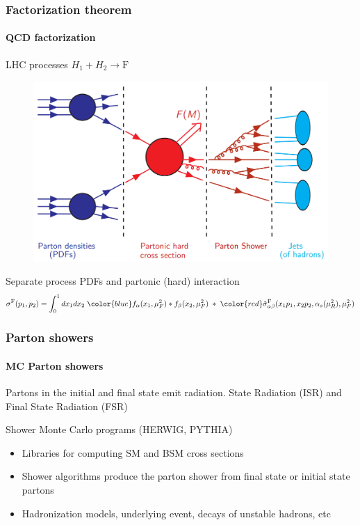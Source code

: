 \documentclass[aspectratio=43]{beamer}
\begin{document}
\begin{frame}

	\frametitle{Factorization theorem}
	\framesubtitle{QCD factorization}
	
	\center \footnotesize LHC processes $H_{1} + H_{2} \rightarrow \textrm{F}$
	
	\begin{figure}
		\includegraphics[width = 7 cm]{plots/factorization_1.png}
	\end{figure}
	
	\footnotesize {Separate process {\color{blue}PDFs} and {\color{red} partonic (hard) interaction}	
	\begin{equation}
		\sigma^{\textrm{F}}(p_{1}, p_{2}) =
		\int_{0}^{1} dx_{1} dx_{2} \; {\color{blue} f_{\alpha}(x_{1}, \mu_{F}^{2}) \ast f_{\beta}(x_{2}, \mu_{F}^{2})}
		\; \ast \;  
		{\color{red}\hat{\sigma}^{\textrm{F}}_{\alpha \beta}(x_{1}p_{1}, x_{2}p_{2}, \alpha_{s}(\mu_{R}^{2}), \mu_{F}^{2})} \nonumber
	\end{equation}}
		
\end{frame}

\begin{frame}

	\frametitle{Parton showers}
	\framesubtitle{MC Parton showers}
	
	\footnotesize Partons in the initial and final state emit radiation. State Radiation (ISR) and Final State Radiation (FSR)
	
	\vspace{0.1 cm}
	\center \color{red} Shower Monte Carlo programs (HERWIG, PYTHIA)
	\vspace{0.15 cm}
	
	\begin{itemize} 
		\item Libraries for computing SM and BSM cross sections
		\item Shower algorithms produce the parton shower from final state or initial state partons
		\item Hadronization models, underlying event, decays of unstable hadrons, etc
	\end{itemize}

\end{frame}
\end{document}
